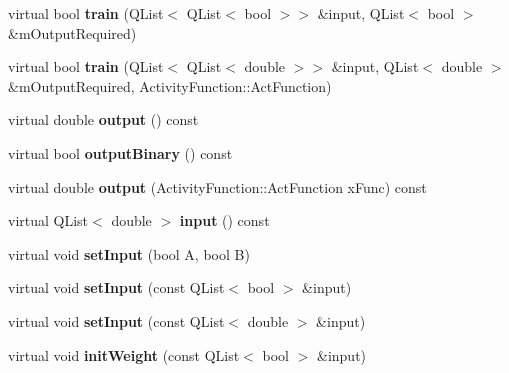 \begin{DoxyCompactItemize}
\item 
\hypertarget{class_x_neuron_ac5616106c0fbf7c527d724b6998c1277}{}\label{class_x_neuron_ac5616106c0fbf7c527d724b6998c1277} 
virtual bool {\bfseries train} (Q\+List$<$ Q\+List$<$ bool $>$$>$ \&input, Q\+List$<$ bool $>$ \&m\+Output\+Required)
\item 
\hypertarget{class_x_neuron_a02e6eed23c4b1d131d2f0fcc2bc358e6}{}\label{class_x_neuron_a02e6eed23c4b1d131d2f0fcc2bc358e6} 
virtual bool {\bfseries train} (Q\+List$<$ Q\+List$<$ double $>$$>$ \&input, Q\+List$<$ double $>$ \&m\+Output\+Required, Activity\+Function\+::\+Act\+Function)
\item 
\hypertarget{class_x_neuron_ac76b3d3ca7fad9a880b83fa5714e1705}{}\label{class_x_neuron_ac76b3d3ca7fad9a880b83fa5714e1705} 
virtual double {\bfseries output} () const
\item 
\hypertarget{class_x_neuron_a7a6306e0dc045f27136252f84870abb7}{}\label{class_x_neuron_a7a6306e0dc045f27136252f84870abb7} 
virtual bool {\bfseries output\+Binary} () const
\item 
\hypertarget{class_x_neuron_a54ef9c2ed729e21641a967d62c956f91}{}\label{class_x_neuron_a54ef9c2ed729e21641a967d62c956f91} 
virtual double {\bfseries output} (Activity\+Function\+::\+Act\+Function x\+Func) const
\item 
\hypertarget{class_x_neuron_aba98d98aaf1e1027239824d19b3797aa}{}\label{class_x_neuron_aba98d98aaf1e1027239824d19b3797aa} 
virtual Q\+List$<$ double $>$ {\bfseries input} () const
\item 
\hypertarget{class_x_neuron_a0ff6275e2532503c795f77e165b59784}{}\label{class_x_neuron_a0ff6275e2532503c795f77e165b59784} 
virtual void {\bfseries set\+Input} (bool A, bool B)
\item 
\hypertarget{class_x_neuron_a6c1a40a9a965fa2e3ae34988b048014b}{}\label{class_x_neuron_a6c1a40a9a965fa2e3ae34988b048014b} 
virtual void {\bfseries set\+Input} (const Q\+List$<$ bool $>$ \&input)
\item 
\hypertarget{class_x_neuron_a16c2071b13ca0e25e88bfa113881d489}{}\label{class_x_neuron_a16c2071b13ca0e25e88bfa113881d489} 
virtual void {\bfseries set\+Input} (const Q\+List$<$ double $>$ \&input)
\item 
\hypertarget{class_x_neuron_a353abf29fecd904cbdbae031b99f5d23}{}\label{class_x_neuron_a353abf29fecd904cbdbae031b99f5d23} 
virtual void {\bfseries init\+Weight} (const Q\+List$<$ bool $>$ \&input)
\item 
\hypertarget{class_x_neuron_a57c9fa808e03d27c96edc9d7774534ce}{}\label{class_x_neuron_a57c9fa808e03d27c96edc9d7774534ce} 

\end{DoxyCompactItemize}
